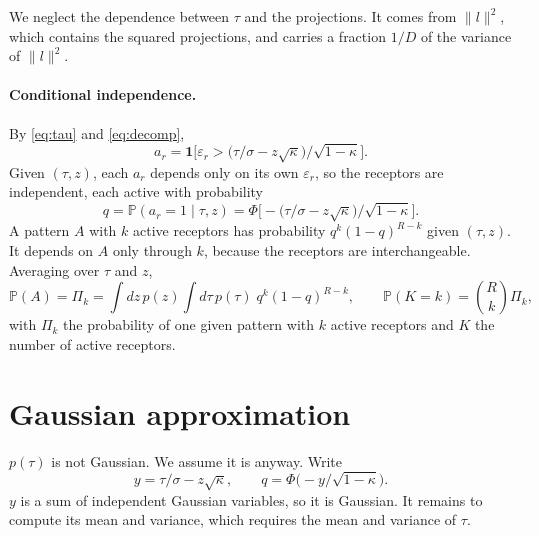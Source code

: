 \documentclass[11pt,a4paper]{article}
\newcommand{\PP}{\mathbb{P}}
\newcommand{\one}{\mathbf{1}}
\begin{document}
We neglect the dependence between $\tau$ and the projections. It comes from $\|l\|^2$,
which contains the squared projections, and carries a fraction $1/D$ of the variance of
$\|l\|^2$.

\paragraph{Conditional independence.} By \eqref{eq:tau} and \eqref{eq:decomp},
\begin{equation}
  a_r=\one\Big[\varepsilon_r>\big(\tau/\sigma-z\sqrt\kappa\big)/\sqrt{1-\kappa}\Big].
\end{equation}
Given $(\tau,z)$, each $a_r$ depends only on its own $\varepsilon_r$, so the receptors are
independent, each active with probability
\begin{equation}
  q=\PP(a_r=1\mid\tau,z)=\Phi\Big[-\big(\tau/\sigma-z\sqrt\kappa\big)/\sqrt{1-\kappa}\Big].
\end{equation}
A pattern $A$ with $k$ active receptors has probability $q^k(1-q)^{R-k}$ given $(\tau,z)$.
It depends on $A$ only through $k$, because the receptors are interchangeable. Averaging
over $\tau$ and $z$,
\begin{equation}
  \PP(A)=\Pi_k=\int dz\,p(z)\int d\tau\,p(\tau)\;q^k(1-q)^{R-k},
  \qquad
  \PP(K=k)=\binom Rk\Pi_k ,
  \label{eq:Pi_exact}
\end{equation}
with $\Pi_k$ the probability of one given pattern with $k$ active receptors and $K$ the
number of active receptors.

\section{Gaussian approximation}

$p(\tau)$ is not Gaussian. We assume it is anyway. Write
\begin{equation}
  y=\tau/\sigma-z\sqrt\kappa,
  \qquad
  q=\Phi\big(-y/\sqrt{1-\kappa}\big).
\end{equation}
$y$ is a sum of independent Gaussian variables, so it is Gaussian. It remains to compute its
mean and variance, which requires the mean and variance of $\tau$.
\end{document}
